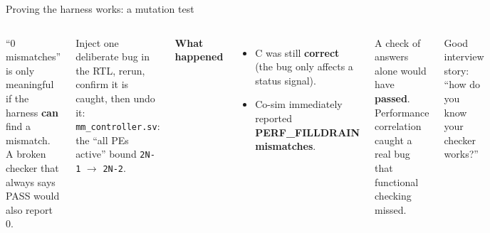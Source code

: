 \documentclass[aspectratio=169,11pt]{beamer}
\newcommand{\file}[1]{\texttt{\textcolor{copper}{#1}}}
\newcommand{\sig}[1]{\texttt{#1}}
\begin{document}
\begin{frame}{Proving the harness works: a mutation test}
  \begin{columns}[T]
    \begin{why}
      ``0 mismatches'' is only meaningful if the harness \textbf{can} find a mismatch. A broken
      checker that always says PASS would also report 0.
    \end{why}
    \begin{how}
      Inject one deliberate bug in the RTL, rerun, confirm it is caught, then undo it:\\[1mm]
      \file{mm\_controller.sv}: the ``all PEs active'' bound \sig{2N-1} $\to$ \sig{2N-2}.
    \end{how}
    \small
    \textbf{What happened}
    \begin{itemize}
      \item C was still \textbf{correct} (the bug only affects a status signal).
      \item Co-sim immediately reported \textbf{PERF\_FILLDRAIN mismatches}.
    \end{itemize}
    \begin{tcolorbox}[colback=coppert,colframe=copper,arc=2mm]
      \small A check of answers alone would have \textbf{passed}. Performance correlation caught a
      real bug that functional checking missed.
    \end{tcolorbox}
    \footnotesize\color{muted} Good interview story: ``how do you know your checker works?''
  \end{columns}
\end{frame}
\end{document}

